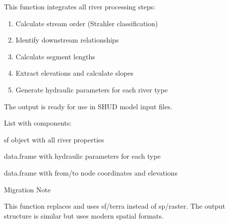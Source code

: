 \documentclass[a4paper]{book}
\begin{document}
%
\begin{Details}\relax
This function integrates all river processing steps:
\begin{enumerate}

\item{} Calculate stream order (Strahler classification)
\item{} Identify downstream relationships
\item{} Calculate segment lengths
\item{} Extract elevations and calculate slopes
\item{} Generate hydraulic parameters for each river type

\end{enumerate}


The output is ready for use in SHUD model input files.
\end{Details}
%
\begin{Value}
List with components:
\begin{ldescription}
\item[\code{network}] sf object with all river properties
\item[\code{river\_types}] data.frame with hydraulic parameters for each type
\item[\code{points}] data.frame with from/to node coordinates and elevations
\end{ldescription}
\end{Value}
%
\begin{Section}{Migration Note}

This function replaces  and uses sf/terra instead of sp/raster.
The output structure is similar but uses modern spatial formats.
\end{Section}
%
\begin{Examples}
\end{Examples}
\end{document}
